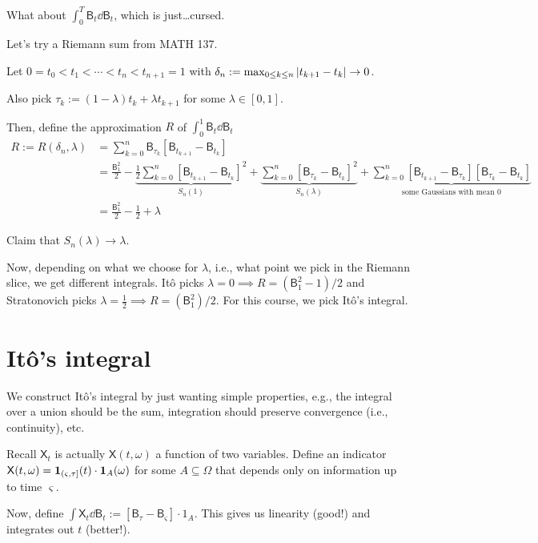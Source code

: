 \documentclass[notes]{agony}
\newcommand{\rv}{\mathsf}
\newcommand{\B}{\rv{B}}
\newcommand{\X}{\rv{X}}
\begin{document}
What about $\int_0^T \rv B_t \dd{\rv B_t}$, which is just\dots cursed.

Let's try a Riemann sum from MATH 137.

\begin{defn}
	Let $0 = t_0 < t_1 < \dotsb < t_n < t_{n+1} = 1$
	with $\delta_n := \max_{0\leq k\leq n}\abs{t_{k+1} - t_k} \to 0$.

	Also pick $\tau_k := (1-\lambda)t_k + \lambda t_{k+1}$ for some $\lambda \in [0,1]$.

	Then, define the approximation $R$ of $\int_0^1 \rv B_t \dd{\rv B_t}$
	\begin{align*}
		R := R(\delta_n,\lambda)
		 & = \sum_{k=0}^n \rv B_{\tau_k}[\rv B_{t_{k+1}} - \rv B_{t_k}]                                                 \\
		 & = \frac{\B_1^2}{2}
		- \underbrace{\frac12\sum_{k=0}^n[\B_{t_{k+1}}-\B_{t_k}]^2}_{S_n(1)}
		+ \underbrace{\sum_{k=0}^n[\B_{\tau_k}-\B_{t_k}]^2}_{S_n(\lambda)}
		+ \underbrace{\sum_{k=0}^n[\B_{t_{k+1}}-\B_{\tau_k}][\B_{\tau_k}-\B_{t_k}]}_{\text{some Gaussians with mean 0}} \\
		 & = \frac{\B_1^2}{2} -\frac12 + \lambda
	\end{align*}
\end{defn}

Claim that $S_n(\lambda) \to \lambda$.


Now, depending on what we choose for $\lambda$, i.e., what point we pick in
the Riemann slice, we get different integrals.
Itô picks $\lambda = 0 \implies R = (\B_1^2-1)/2$
and Stratonovich picks $\lambda = \frac12 \implies R = (\B_1^2)/2$.
For this course, we pick Itô's integral.

\section{Itô's integral}

We construct Itô's integral by just wanting simple properties, e.g.,
the integral over a union should be the sum,
integration should preserve convergence (i.e., continuity),
etc.

Recall $\X_t$ is actually $\X(t,\omega)$ a function of two variables.
Define an indicator $\X(t,\omega) = \vb 1_{(\varsigma,\tau]}(t) \cdot \vb 1_A(\omega)$
for some $A \subseteq \Omega$ that depends only on information up to time $\varsigma$.

Now, define $\int \X_t \dd{\B_t} := [\B_\tau - \B_\varsigma]\cdot 1_A$.
This gives us linearity (good!) and integrates out $t$ (better!).
\end{document}
